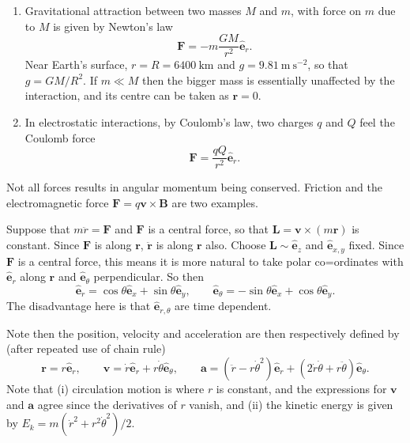\documentclass[letter-paper]{tufte-book}
\newenvironment{example}[1][Example]{\begin{trivlist}
\item[\hskip \labelsep {\bfseries #1}]}{\end{trivlist}}
\newcommand{\ab}{\boldsymbol{a}}
\newcommand{\Bb}{\boldsymbol{B}}
\newcommand{\eb}{\boldsymbol{e}}
\newcommand{\Fb}{\boldsymbol{F}}
\newcommand{\Lb}{\boldsymbol{L}}
\newcommand{\rb}{\boldsymbol{r}}
\newcommand{\vb}{\boldsymbol{v}}
\begin{document}
\begin{example}
  \begin{enumerate}
    \item Gravitational attraction between two masses $M$ and $m$, with force on
    $m$ due to $M$ is given by Newton's law
    \begin{equation*}
      \Fb = -m\frac{GM}{r^2}\hat{\eb}_r.
    \end{equation*}
    Near Earth's surface, $r = R = 6400\ \mathrm{km}$ and $g = 9.81\ \mathrm{m}\
    \mathrm{s}^{-2}$, so that $g = GM/R^2$. If $m\ll M$ then the bigger mass is
    essentially unaffected by the interaction, and its centre can be taken as $\rb
    = 0$.
    
    \item In electrostatic interactions, by Coulomb's law, two charges $q$ and
    $Q$ feel the Coulomb force
    \begin{equation*}
      \Fb = \frac{qQ}{r^2}\hat{\eb}_r.
    \end{equation*}
  \end{enumerate}
\end{example}
Not all forces results in angular momentum being conserved. Friction and the
electromagnetic force $\Fb = q\vb\times \Bb$ are two examples.

Suppose that $m\ddot{r} = \Fb$ and $\Fb$ is a central force, so that $\Lb =
\vb\times(m\rb)$ is constant. Since $\Fb$ is along $\rb$, $\ddot{\rb}$ is along
$\rb$ also. Choose $\Lb\sim\hat{\eb}_z$ and $\hat{\eb}_{x,y}$ fixed. Since $\Fb$
is a central force, this means it is more natural to take polar co=ordinates
with $\hat{\eb}_r$ along $\rb$ and $\hat{\eb}_\theta$ perpendicular. So
then
\begin{equation*}
  \hat{\eb}_r = \cos\theta\hat{\eb}_x + \sin\theta \hat{\eb}_y,\qquad
  \hat{\eb}_\theta = -\sin\theta\hat{\eb}_x + \cos\theta \hat{\eb}_y.
\end{equation*}
The disadvantage here is that $\hat{\eb}_{r,\theta}$ are time dependent.

Note then the position, velocity and acceleration are then respectively defined
by (after repeated use of chain rule)
\begin{equation*}
  \rb = r\hat{\eb}_r, \qquad
  \vb = \dot{r}\hat{\eb}_r + r\dot{\theta}\hat{\eb}_\theta,\qquad
  \ab = (\ddot{r} - r\dot{\theta}^2)\hat{\eb}_r + 
    (2\dot{r}\dot{\theta} + r\ddot{\theta})\hat{\eb}_\theta.
\end{equation*}
Note that (i) circulation motion is where $r$ is constant, and the expressions
for $\vb$ and $\ab$ agree since the derivatives of $r$ vanish, and (ii) the
kinetic energy is given by $E_k = m(\dot{r}^2 + r^2\dot{\theta}^2)/2$.
\end{document}
